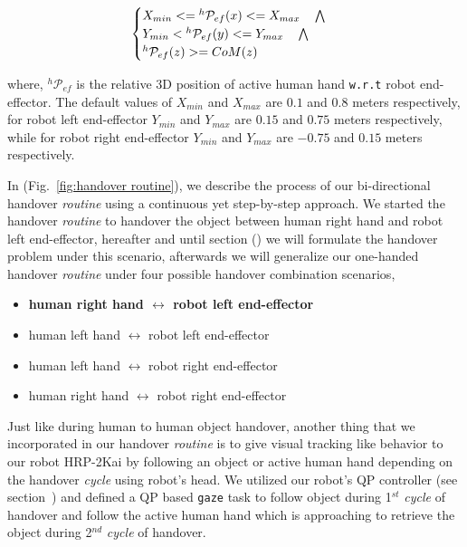 \begin{equation}\label{reachable}
	\centering
	\begin{cases}
	
		X_{min} <= {}^{h}\mathcal{P}_{ef}(x) <= X_{max} \quad \bigwedge \\
		Y_{min} < {}^{h}\mathcal{P}_{ef}(y) <= Y_{max} \quad \bigwedge \\
		{}^{h}\mathcal{P}_{ef}(z) >= CoM(z)
			
	\end{cases}
\end{equation}

where, $ {}^{h}\mathcal{P}_{ef} $ is the relative 3D position of active human hand \texttt{w.r.t} robot end-effector. The default values of $ X_{min} $ and $ X_{max} $ are $ 0.1 $ and $ 0.8 $ meters respectively, for robot left end-effector $ Y_{min} $ and $ Y_{max} $ are $ 0.15 $ and $ 0.75 $ meters respectively, while for robot right end-effector $ Y_{min} $ and $ Y_{max} $ are $ -0.75 $ and $ 0.15 $ meters respectively.

In (Fig.~\ref{fig:handover routine}), we describe the process of our bi-directional handover \textit{routine} using a continuous yet step-by-step approach. We started the handover \textit{routine} to handover the object between human right hand and robot left end-effector, hereafter and until section () we will formulate the handover problem under this scenario, afterwards we will generalize our one-handed handover \textit{routine} under four possible handover combination scenarios,

\begin{itemize}
	\item \textbf{human right hand $\longleftrightarrow$ robot left end-effector}
	\item human left hand $\longleftrightarrow$ robot left end-effector 
	\item human left hand $\longleftrightarrow$  robot right end-effector
	\item human right hand $\longleftrightarrow$ robot right end-effector
\end{itemize}


Just like during human to human object handover, another thing that we incorporated in our handover \textit{routine} is to give visual tracking like behavior to our robot HRP-2Kai by following an object or active human hand depending on the handover \textit{cycle} using robot's head. We utilized our robot's QP controller (see section~) and defined a QP based \texttt{gaze} task to follow object during 1$^{st}$ \textit{cycle} of handover and follow the active human hand which is approaching to retrieve the object during 2$^{nd}$ \textit{cycle} of handover.

